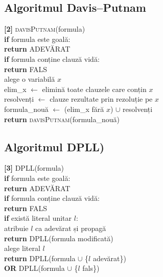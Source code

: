 \documentclass[12pt,a4paper]{article}
\begin{document}
\subsection{Algoritmul Davis–Putnam}
\begin{flushleft}
\textbf{[2]} \textsc{davisPutnam}(formula)\\
\hspace*{1em}\textbf{if} formula este goală:\\
\hspace*{2em}\textbf{return} ADEVĂRAT\\
\hspace*{1em}\textbf{if} formula conține clauză vidă:\\
\hspace*{2em}\textbf{return} FALS\\
\hspace*{1em}alege o variabilă \(x\)\\
\hspace*{1em}elim\_x \(\leftarrow\) elimină toate clauzele care conțin \(x\)\\
\hspace*{1em}resolvenți \(\leftarrow\) clauze rezultate prin rezoluție pe \(x\)\\
\hspace*{1em}formula\_nouă \(\leftarrow\) (elim\_x fără \(x\)) \(\cup\) resolvenți\\
\hspace*{1em}\textbf{return} \textsc{davisPutnam}(formula\_nouă)
\end{flushleft}

\subsection{Algoritmul DPLL)}
\begin{flushleft}
\textbf{[3]} \textsc{DPLL}(formula)\\
\hspace*{1em}\textbf{if} formula este goală:\\
\hspace*{2em}\textbf{return} ADEVĂRAT\\
\hspace*{1em}\textbf{if} formula conține clauză vidă:\\
\hspace*{2em}\textbf{return} FALS\\
\hspace*{1em}\textbf{if} există literal unitar \(l\):\\
\hspace*{2em}atribuie \(l\) ca adevărat și propagă\\
\hspace*{2em}\textbf{return} \textsc{DPLL}(formula modificată)\\
\hspace*{1em}alege literal \(l\)\\
\hspace*{1em}\textbf{return} \textsc{DPLL}(formula \(\cup\) \{\(l\) adevărat\}) \\ 
\hspace*{5em}\textbf{OR} \textsc{DPLL}(formula \(\cup\) \{\(l\) fals\})
\end{flushleft}
\end{document}
